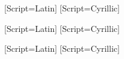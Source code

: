 \usepackage{fontspec}

\setmainfont{Times New Roman}[Script=Latin]
\newfontfamily{}[Script=Cyrillic]

\setsansfont{Arial}[Script=Latin]
\newfontfamily{}[Script=Cyrillic]

\setmonofont{Courier New}[Script=Latin]
\newfontfamily{}[Script=Cyrillic]

\usepackage{polyglossia}
\setmainlanguage{russian}

\usepackage{indentfirst}
\usepackage{float}
\usepackage{geometry}
\geometry{a4paper, left=3cm, right=2cm, top=2cm, bottom=2cm}
